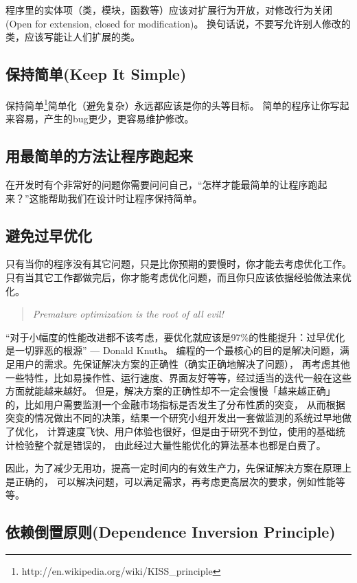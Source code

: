 \documentclass{book}
\begin{document}
程序里的实体项（类，模块，函数等）应该对扩展行为开放，对修改行为关闭(Open for extension, closed for modification)。
换句话说，不要写允许别人修改的类，应该写能让人们扩展的类。

\subsection{保持简单(Keep It Simple)}

保持简单\footnote{http://en.wikipedia.org/wiki/KISS\_principle}简单化（避免复杂）永远都应该是你的头等目标。
简单的程序让你写起来容易，产生的bug更少，更容易维护修改。

\subsection{用最简单的方法让程序跑起来}

在开发时有个非常好的问题你需要问问自己，“怎样才能最简单的让程序跑起来？”这能帮助我们在设计时让程序保持简单。

\subsection{避免过早优化}

只有当你的程序没有其它问题，只是比你预期的要慢时，你才能去考虑优化工作。
只有当其它工作都做完后，你才能考虑优化问题，而且你只应该依据经验做法来优化。
\begin{quote}
 \emph{Premature optimization is the root of all evil!}
\end{quote}
“对于小幅度的性能改进都不该考虑，要优化就应该是97\%的性能提升：过早优化是一切罪恶的根源” — Donald Knuth。
编程的一个最核心的目的是解决问题，满足用户的需求。先保证解决方案的正确性（确实正确地解决了问题），
再考虑其他一些特性，比如易操作性、运行速度、界面友好等等，经过适当的迭代一般在这些方面就能越来越好。
但是，解决方案的正确性却不一定会慢慢「越来越正确」的，比如用户需要监测一个金融市场指标是否发生了分布性质的突变，
从而根据突变的情况做出不同的决策，结果一个研究小组开发出一套做监测的系统过早地做了优化，
计算速度飞快、用户体验也很好，但是由于研究不到位，使用的基础统计检验整个就是错误的，
由此经过大量性能优化的算法基本也都是白费了。

因此，为了减少无用功，提高一定时间内的有效生产力，先保证解决方案在原理上是正确的，
可以解决问题，可以满足需求，再考虑更高层次的要求，例如性能等等。


\subsection{依赖倒置原则(Dependence Inversion Principle)}
\end{document}

